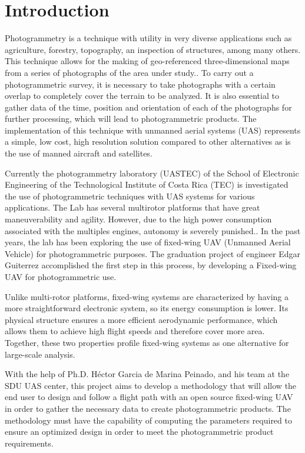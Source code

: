 \section{Introduction}
Photogrammetry is a technique with utility in very diverse applications such as agriculture, forestry, topography, an inspection of structures, among many others. This technique allows for the making of geo-referenced three-dimensional maps from a series of photographs of the area under study.\cite{Articulo}. To carry out a photogrammetric survey, it is necessary to take photographs with a certain overlap to completely cover the terrain to be analyzed. It is also essential to gather data of the time, position and orientation of each of the photographs for further processing, which will lead to photogrammetric products. The implementation of this technique with unmanned aerial systems (UAS) represents a simple, low cost, high resolution solution compared to other alternatives as is the use of manned aircraft and satellites.\cite{FotogrametryThesis}

Currently  the photogrammetry laboratory (UASTEC) of the School of Electronic Engineering of the Technological Institute of Costa Rica (TEC) is investigated the use of photogrammetric techniques with UAS systems for various applications. The Lab has several multirotor platforms that have great maneuverability and agility. However, due to the high power consumption associated with the multiples engines, autonomy is severely punished.\cite{Leonardo}. In the past years, the lab has been exploring the use of fixed-wing UAV (Unmanned Aerial Vehicle) for photogrammetric purposes. The graduation project of engineer  Edgar Guiterrez accomplished the first step in this process, by developing a Fixed-wing UAV for photogrammetric use.\cite{Edgar}\cite{conference}

Unlike multi-rotor platforms, fixed-wing systems are characterized by having a more straightforward electronic system, so its energy consumption is lower. Its physical structure ensures a more efficient aerodynamic performance, which allows them to achieve high flight speeds and therefore cover more area. Together, these two properties profile fixed-wing systems as one alternative for large-scale analysis.

With the help of Ph.D. Héctor Garcia de Marina Peinado, and  his team at the SDU UAS center, this project aims to develop a methodology that will allow the end user to design and follow a flight path with an open source fixed-wing UAV in order  to gather the necessary data to create photogrammetric products. The methodology must have the capability of computing the parameters required to ensure an optimized design in order to meet the photogrammetric product requirements.

